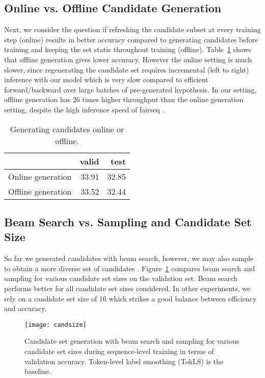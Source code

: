 \documentclass[11pt,a4paper]{article}
\begin{document}
\subsection{Online vs. Offline Candidate Generation}
\label{sec:results_gen}
Next, we consider the question if refreshing the candidate subset at every training step (online) results in better accuracy compared to generating candidates before training and keeping the set static throughout training (offline).
Table~\ref{tab:onoffline} shows that offline generation gives lower accuracy.
However the online setting is much slower, since regenerating the candidate set requires incremental (left to right) inference with our model which is very slow compared to efficient forward/backward over large batches of pre-generated hypothesis.
In our setting, offline generation has 26 times higher throughput than the online generation setting, despite the high inference speed of fairseq \citep{gehring2017icml}.
\begin{table}
\centering
\begin{tabular}{lrr}
\toprule
& \bf valid & \bf test \\ \midrule
Online generation & 33.91 & 32.85 \\
Offline generation & 33.52 & 32.44 \\
\bottomrule
\end{tabular}
\caption{Generating candidates online or offline.
}
\label{tab:onoffline}
\end{table}


\subsection{Beam Search vs. Sampling and Candidate Set Size}
\label{sec:results_sampling}

So far we generated candidates with beam search, however, we may also sample to obtain a more diverse set of candidates \citep{shen2016mrt}.
Figure~\ref{fig:candset} compares beam search and sampling for various candidate set sizes on the validation set.
Beam search performs better for all candidate set sizes considered.
In other experiments, we rely on a candidate set size of 16 which strikes a good balance between efficiency and accuracy.

\begin{figure}[t]
\texttt{[image: candsize]}
\caption{Candidate set generation with beam search and sampling for various candidate set sizes during sequence-level training in terms of validation accuracy. Token-level label smoothing (TokLS) is the baseline.}
\label{fig:candset}
\end{figure}
\end{document}
